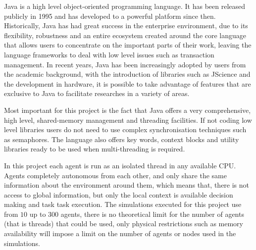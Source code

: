 Java is a high level object-oriented programming language. It has been released publicly in 1995 and has developed to a powerful platform since then. Historically, Java has had great success in the enterprise environment, due to its flexibility, robustness and an entire ecosystem created around the core language that allows users to concentrate on the important parts of their work, leaving the language frameworks to deal with low level issues such as transaction management. In recent years, Java has been increasingly adopted by users from the academic background, with the introduction of libraries such as JScience and the development in hardware, it is possible to take advantage of features that are exclusive to Java to facilitate researches in a variety of areas.

Most important for this project is the fact that Java offers a very comprehensive, high level, shared-memory management and threading facilities. If not coding low level libraries users do not need to use complex synchronisation techniques such as semaphores. The language also offers key words, context blocks and utility libraries ready to be used when multi-threading is required.

In this project each agent is run as an isolated thread in any available CPU. Agents completely autonomous from each other, and only share the same information about the environment around them, which means that, there is not access to global information, but only the local context is available decision making and task task execution. The simulations executed for this project use from $10$ up to $300$ agents, there is no theoretical limit for the number of agents (that is threads) that could be used, only physical restrictions such as memory availability will impose a limit on the number of agents or nodes used in the simulations.